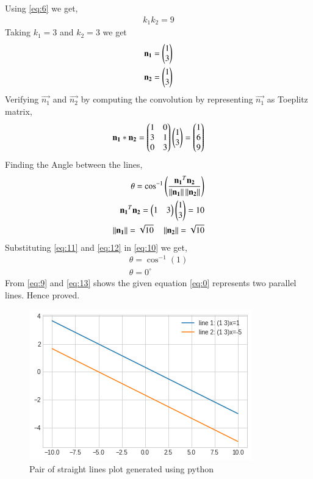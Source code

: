 \documentclass[journal,12pt,twocolumn]{IEEEtran}
\begin{document}
Using \eqref{eq:6} we get,
\begin{align}
k_1k_2 = 9
\end{align}
Taking $k_1=3$ and $k_2 = 3$ we get
\begin{align}
\mathbf{n_1}=\begin{pmatrix}1\\3\end{pmatrix}\\
\mathbf{n_2}=\begin{pmatrix}1\\3\end{pmatrix}
\end{align}
Verifying $\vec{n_1}$ and $\vec{n_2}$ by computing the convolution by representing $\vec{n_1}$ as Toeplitz matrix,
\begin{align}
\mathbf{n_1}*\mathbf{n_2}=\begin{pmatrix}1&0\\3&1\\0&3\end{pmatrix}\begin{pmatrix}1\\3\end{pmatrix}=\begin{pmatrix}1\\6\\9\end{pmatrix}
\end{align}
Finding the Angle between the lines,
\begin{align}
\theta = \cos^{-1}\left(\frac{\mathbf{n_1}^T\mathbf{n_2}}{\left\lVert\mathbf{n_1}\right\rVert\left\lVert\mathbf{n_2}\right\rVert}\right) \label{eq:10}\\
\mathbf{n_1}^T\mathbf{n_2} = \begin{pmatrix}1&3\end{pmatrix}\begin{pmatrix}1\\3\end{pmatrix} = 10 \label{eq:11}\\
\left\lVert\mathbf{n_1}\right\rVert = \sqrt{10}\quad \left\lVert\mathbf{n_2}\right\rVert=\sqrt{10} \label{eq:12}
\end{align}
Substituting \eqref{eq:11} and \eqref{eq:12} in \eqref{eq:10} we get,
\begin{align}
\theta = \cos^{-1}(1)\\
\theta = 0^{\circ}\label{eq:13}
\end{align}
From \eqref{eq:9} and \eqref{eq:13} shows the given equation \eqref{eq:0} represents two parallel lines. Hence proved.
\begin{figure}[!ht]
\centering
\includegraphics[width=\columnwidth]{Straight_lines.png}
\caption{Pair of straight lines plot generated using python}
\label{fig:plot}
\end{figure}
\end{document}
